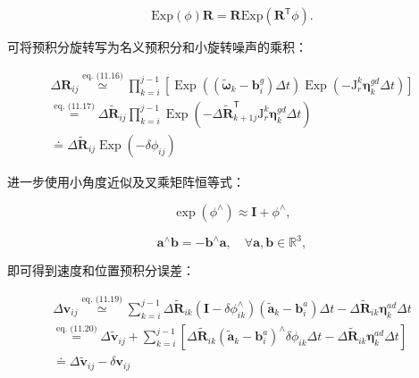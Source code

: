 \begin{equation}
\mathrm{Exp} (\phi) \boldsymbol {R} = \boldsymbol {R} \mathrm{Exp} (\boldsymbol {R} ^ {\mathsf {T}} \phi).\tag{11.17}
\end{equation}

可将预积分旋转写为名义预积分和小旋转噪声的乘积：

\begin{equation}
\begin{array}{l} \Delta \boldsymbol {R} _ {i j} \stackrel {{\text {eq. (11.16)}}} {{\simeq}} \prod_ {k = i} ^ {j - 1} \left[ \operatorname{Exp} \left((\tilde {\boldsymbol {\omega}} _ {k} - \mathbf {b} _ {i} ^ {g})   \Delta t\right) \operatorname{Exp} \left(- \mathrm{J} _ {r} ^ {k}   \boldsymbol {\eta} _ {k} ^ {g d}   \Delta t\right) \right] \\ \stackrel {{\text {eq. (11.17)}}} {{=}} \Delta \tilde {\boldsymbol {R}} _ {i j} \prod_ {k = i} ^ {j - 1} \operatorname{Exp} \left(- \Delta \tilde {\boldsymbol {R}} _ {k + 1 j} ^ {\mathsf {T}}   \mathrm{J} _ {r} ^ {k}   \boldsymbol {\eta} _ {k} ^ {g d}   \Delta t\right) \\ \doteq \Delta \tilde {\boldsymbol {R}} _ {i j} \operatorname{Exp} (- \delta \phi_ {i j}) \end{array}\tag{11.18}
\end{equation}

进一步使用小角度近似及叉乘矩阵恒等式：

\begin{equation}
\exp (\phi^ {\wedge}) \approx \mathbf {I} + \phi^ {\wedge},\tag{11.19}
\end{equation}

\begin{equation}
\mathbf {a} ^ {\wedge} \mathbf {b} = - \mathbf {b} ^ {\wedge} \mathbf {a}, \quad \forall \mathbf {a}, \mathbf {b} \in \mathbb {R} ^ {3},\tag{11.20}
\end{equation}

即可得到速度和位置预积分误差：

\begin{equation}
\begin{array}{l} \Delta \boldsymbol {v} _ {i j} \stackrel {{\text {eq. (11.19)}}} {{\simeq}} \sum_ {k = i} ^ {j - 1} \Delta \tilde {\boldsymbol {R}} _ {i k} (\mathbf {I} - \delta \phi_ {i k} ^ {\wedge}) \left(\tilde {\mathbf {a}} _ {k} - \mathbf {b} _ {i} ^ {a}\right) \Delta t - \Delta \tilde {\boldsymbol {R}} _ {i k} \boldsymbol {\eta} _ {k} ^ {a d} \Delta t \\ \stackrel {{\text {eq. (11.20)}}} {{=}} \Delta \tilde {\boldsymbol {v}} _ {i j} + \sum_ {k = i} ^ {j - 1} \left[ \Delta \tilde {\boldsymbol {R}} _ {i k} \left(\tilde {\mathbf {a}} _ {k} - \mathbf {b} _ {i} ^ {a}\right) ^ {\wedge} \delta \phi_ {i k} \Delta t - \Delta \tilde {\boldsymbol {R}} _ {i k} \boldsymbol {\eta} _ {k} ^ {a d} \Delta t \right] \\ \doteq \Delta \tilde {\boldsymbol {v}} _ {i j} - \delta \boldsymbol {v} _ {i j} \end{array}\tag{11.21}
\end{equation}

